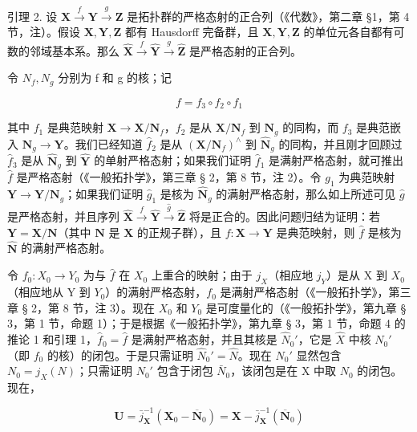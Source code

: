 引理 2. 设 \(\mathbf{X} \xrightarrow{f} \mathbf{Y} \xrightarrow{g} \mathbf{Z}\) 是拓扑群的严格态射的正合列（《代数》，第二章 §1，第 4 节，注）。假设 \(\mathbf{X}, \mathbf{Y}, \mathbf{Z}\) 都有 Hausdorff 完备群，且 \(\mathbf{X}, \mathbf{Y}, \mathbf{Z}\) 的单位元各自都有可数的邻域基本系。那么 \(\hat{\mathbf{X}} \xrightarrow{f} \hat{\mathbf{Y}} \xrightarrow{g} \hat{\mathbf{Z}}\) 是严格态射的正合列。

令 \(N_{f}, N_{g}\) 分别为 f 和 g 的核；记

\[
f = f _ {3} \circ f _ {2} \circ f _ {1}
\]

其中 \(f_1\) 是典范映射 \(\mathbf{X} \to \mathbf{X} / \mathbf{N}_f\)，\(f_2\) 是从 \(\mathbf{X} / \mathbf{N}_f\) 到 \(\mathbf{N}_g\) 的同构，而 \(f_3\) 是典范嵌入 \(\mathbf{N}_g \to \mathbf{Y}\)。我们已经知道 \(\hat{f}_2\) 是从 \((\mathbf{X} / \mathbf{N}_f)^{\wedge}\) 到 \(\hat{\mathbf{N}}_g\) 的同构，并且刚才回顾过 \(\hat{f}_3\) 是从 \(\hat{\mathbf{N}}_g\) 到 \(\hat{\mathbf{Y}}\) 的单射严格态射；如果我们证明 \(\hat{f}_1\) 是满射严格态射，就可推出 \(\hat{f}\) 是严格态射（《一般拓扑学》，第三章 § 2，第 8 节，注 2）。令 \(g_1\) 为典范映射 \(\mathbf{Y} \to \mathbf{Y} / \mathbf{N}_g\)；如果我们证明 \(\hat{g}_1\) 是核为 \(\hat{\mathbf{N}}_g\) 的满射严格态射，那么如上所述可见 \(\hat{g}\) 是严格态射，并且序列 \(\hat{\mathbf{X}}\xrightarrow{f}\hat{\mathbf{Y}}\xrightarrow{\hat{g}}\hat{\mathbf{Z}}\) 将是正合的。因此问题归结为证明：若 \(\mathbf{Y}=\mathbf{X}/\mathbf{N}\)（其中 \(\mathbf{N}\) 是 \(\mathbf{X}\) 的正规子群），且 \(f\colon\mathbf{X}\to\mathbf{Y}\) 是典范映射，则 \(\hat{f}\) 是核为 \(\hat{\mathbf{N}}\) 的满射严格态射。

令 \(f_{0}: X_{0} \to Y_{0}\) 为与 \(\hat{f}\) 在 \(X_{0}\) 上重合的映射；由于 \(j_{X}\)（相应地 \(j_{Y}\)）是从 X 到 \(X_{0}\)（相应地从 Y 到 \(Y_{0}\)）的满射严格态射，\(f_{0}\) 是满射严格态射（《一般拓扑学》，第三章 § 2，第 8 节，注 3）。现在 \(X_{0}\) 和 \(Y_{0}\) 是可度量化的（《一般拓扑学》，第九章 § 3，第 1 节，命题 1）；于是根据《一般拓扑学》，第九章 § 3，第 1 节，命题 4 的推论 1 和引理 1，\(\hat{f}_{0} = \hat{f}\) 是满射严格态射，并且其核是 \(\hat{N}_{0}'\)，它是 \(\hat{X}\) 中核 \(N_{0}'\)（即 \(f_{0}\) 的核）的闭包。于是只需证明 \(\hat{N}_{0}' = \hat{N}\)。现在 \(N_{0}'\) 显然包含 \(N_{0} = j_{X}(N)\)；只需证明 \(N_{0}'\) 包含于闭包 \(\bar{N}_{0}\)，该闭包是在 X 中取 \(N_{0}\) 的闭包。现在，

\[
\mathbf {U} = \bar {j} _ {\mathbf {X}} ^ {- 1} (\mathbf {X} _ {0} - \overline {{\mathbf {N}}} _ {0}) = \mathbf {X} - \bar {j} _ {\mathbf {X}} ^ {- 1} (\overline {{\mathbf {N}}} _ {0})
\]

